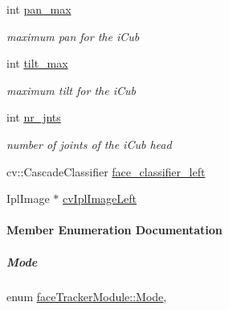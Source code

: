 \begin{DoxyCompactItemize}
int \hyperlink{group__faceTracker_ad31a3d4d74070153bf0b271fbd118655}{pan\+\_\+max}
\begin{DoxyCompactList}\small\item\em maximum pan for the i\+Cub \end{DoxyCompactList}\item 
int \hyperlink{group__faceTracker_a2a91a704569df23ed22496ded4c5e609}{tilt\+\_\+max}
\begin{DoxyCompactList}\small\item\em maximum tilt for the i\+Cub \end{DoxyCompactList}\item 
int \hyperlink{group__faceTracker_afcdd2a0b1f9ca2147af397f8d3caace4}{nr\+\_\+jnts}
\begin{DoxyCompactList}\small\item\em number of joints of the i\+Cub head \end{DoxyCompactList}\item 
cv\+::\+Cascade\+Classifier \hyperlink{group__faceTracker_ae779505f75063e72f4ec5389edf6a790}{face\+\_\+classifier\+\_\+left}
\item 
Ipl\+Image $\ast$ \hyperlink{group__faceTracker_afb7bf90ce880392e99a6d490c56da597}{cv\+Ipl\+Image\+Left}
\end{DoxyCompactItemize}


\paragraph{Member Enumeration Documentation}
\mbox{\label{group__faceTracker_ac6632cfbb140765f8c5cc507e82b3ec7}} 
\subparagraph{\texorpdfstring{Mode}{Mode}}
{\footnotesize\ttfamily enum \hyperlink{group__faceTracker_ac6632cfbb140765f8c5cc507e82b3ec7}{face\+Tracker\+Module\+::\+Mode}\hspace{0.3cm}{\ttfamily [strong]}, {\ttfamily [protected]}}

